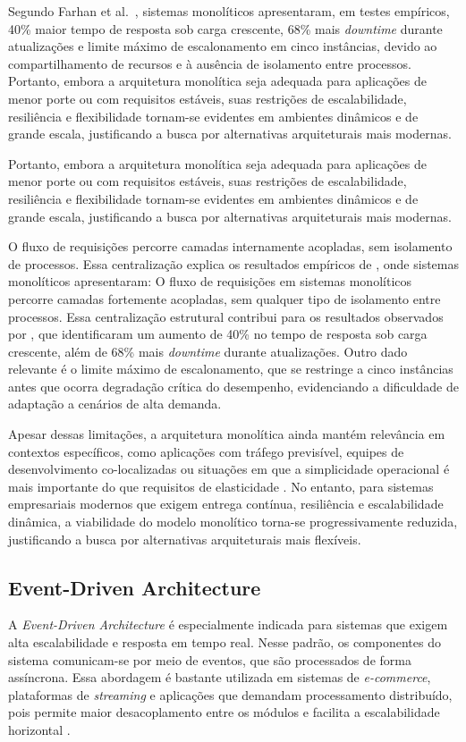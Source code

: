 Segundo Farhan et al.~\cite{farhan2023performance}, sistemas monolíticos apresentaram, em testes empíricos, 40\% maior tempo de resposta sob carga crescente, 68\% mais \textit{downtime} durante atualizações e limite máximo de escalonamento em cinco instâncias, devido ao compartilhamento de recursos e à ausência de isolamento entre processos. Portanto, embora a arquitetura monolítica seja adequada para aplicações de menor porte ou com requisitos estáveis, suas restrições de escalabilidade, resiliência e flexibilidade tornam-se evidentes em ambientes dinâmicos e de grande escala, justificando a busca por alternativas arquiteturais mais modernas.

Portanto, embora a arquitetura monolítica seja adequada para aplicações de menor porte ou com requisitos estáveis, suas restrições de escalabilidade, resiliência e flexibilidade tornam-se evidentes em ambientes dinâmicos e de grande escala, justificando a busca por alternativas arquiteturais mais modernas.

O fluxo de requisições percorre camadas internamente acopladas, sem isolamento de processos. Essa centralização explica os resultados empíricos de \cite{farhan2023performance}, onde sistemas monolíticos apresentaram:
O fluxo de requisições em sistemas monolíticos percorre camadas fortemente acopladas, sem qualquer tipo de isolamento entre processos. Essa centralização estrutural contribui para os resultados observados por \cite{farhan2023performance}, que identificaram um aumento de 40\% no tempo de resposta sob carga crescente, além de 68\% mais \textit{downtime} durante atualizações. Outro dado relevante é o limite máximo de escalonamento, que se restringe a cinco instâncias antes que ocorra degradação crítica do desempenho, evidenciando a dificuldade de adaptação a cenários de alta demanda.

Apesar dessas limitações, a arquitetura monolítica ainda mantém relevância em contextos específicos, como aplicações com tráfego previsível, equipes de desenvolvimento co-localizadas ou situações em que a simplicidade operacional é mais importante do que requisitos de elasticidade \cite{shekhar2023microservices}. No entanto, para sistemas empresariais modernos que exigem entrega contínua, resiliência e escalabilidade dinâmica, a viabilidade do modelo monolítico torna-se progressivamente reduzida, justificando a busca por alternativas arquiteturais mais flexíveis.

\subsection{Event-Driven Architecture}
A \textit{Event-Driven Architecture} é especialmente indicada para sistemas que exigem alta escalabilidade e resposta em tempo real. Nesse padrão, os componentes do sistema comunicam-se por meio de eventos, que são processados de forma assíncrona. Essa abordagem é bastante utilizada em sistemas de \textit{e-commerce}, plataformas de \textit{streaming} e aplicações que demandam processamento distribuído, pois permite maior desacoplamento entre os módulos e facilita a escalabilidade horizontal \cite{jamshidi2016systematic}. 

